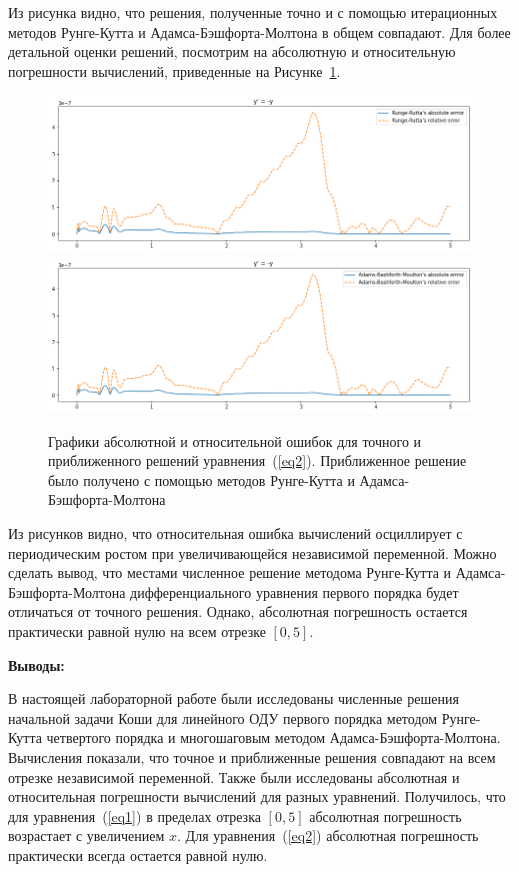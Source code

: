 Из рисунка видно, что решения, полученные точно и с помощью итерационных методов Рунге-Кутта и Адамса-Бэшфорта-Молтона в общем совпадают. Для более детальной оценки решений, посмотрим на абсолютную и относительную погрешности вычислений, приведенные на Рисунке~\ref{fig:errors2}.
\newpage
\begin{figure}
    \centering
    \includegraphics[width=\linewidth]{Figures/rk2.png}
    \includegraphics[width=\linewidth]{Figures/bm2.png}
    \caption{Графики абсолютной и относительной ошибок для точного и приближенного решений уравнения~(\ref{eq2}). Приближенное решение было получено с помощью методов Рунге-Кутта и Адамса-Бэшфорта-Молтона}
    \label{fig:errors2}
\end{figure}

Из рисунков видно, что относительная ошибка вычислений осциллирует с периодическим ростом при увеличивающейся независимой переменной. Можно сделать вывод, что местами численное решение методома Рунге-Кутта и Адамса-Бэшфорта-Молтона дифференциального уравнения первого порядка будет отличаться от точного решения. Однако, абсолютная погрешность остается практически равной нулю на всем отрезке $[0, 5]$.

\textbf{Выводы:}

В настоящей лабораторной работе были исследованы численные решения начальной задачи Коши для линейного ОДУ первого порядка методом Рунге-Кутта четвертого порядка и многошаговым методом Адамса-Бэшфорта-Молтона. Вычисления показали, что точное и приближенные решения совпадают на всем отрезке независимой переменной. Также были исследованы абсолютная и относительная погрешности вычислений для разных уравнений. Получилось, что для уравнения~(\ref{eq1}) в пределах отрезка $[0, 5]$ абсолютная погрешность возрастает с увеличением $x$. Для уравнения~(\ref{eq2}) абсолютная погрешность практически всегда остается равной нулю.